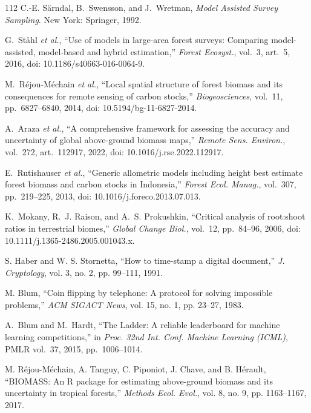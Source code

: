 \documentclass[conference,a4paper]{IEEEtran}
\begin{document}
\begin{thebibliography}{112}
C.-E. S\"arndal, B.~Swensson, and J.~Wretman, \textit{Model Assisted Survey Sampling}. New York: Springer, 1992.

G.~St\aa hl \textit{et al.}, ``Use of models in large-area forest surveys: Comparing model-assisted, model-based and hybrid estimation,'' \textit{Forest Ecosyst.}, vol.~3, art.~5, 2016, doi: 10.1186/s40663-016-0064-9.

M.~R\'ejou-M\'echain \textit{et al.}, ``Local spatial structure of forest biomass and its consequences for remote sensing of carbon stocks,'' \textit{Biogeosciences}, vol.~11, pp.~6827--6840, 2014, doi: 10.5194/bg-11-6827-2014.

A.~Araza \textit{et al.}, ``A comprehensive framework for assessing the accuracy and uncertainty of global above-ground biomass maps,'' \textit{Remote Sens. Environ.}, vol.~272, art.~112917, 2022, doi: 10.1016/j.rse.2022.112917.

E.~Rutishauser \textit{et al.}, ``Generic allometric models including height best estimate forest biomass and carbon stocks in Indonesia,'' \textit{Forest Ecol. Manag.}, vol.~307, pp.~219--225, 2013, doi: 10.1016/j.foreco.2013.07.013.

K.~Mokany, R.~J. Raison, and A.~S. Prokushkin, ``Critical analysis of root:shoot ratios in terrestrial biomes,'' \textit{Global Change Biol.}, vol.~12, pp.~84--96, 2006, doi: 10.1111/j.1365-2486.2005.001043.x.

S. Haber and W. S. Stornetta, ``How to time-stamp a digital document,'' \textit{J. Cryptology}, vol. 3, no. 2, pp. 99--111, 1991.

M. Blum, ``Coin flipping by telephone: A protocol for solving impossible problems,'' \textit{ACM SIGACT News}, vol. 15, no. 1, pp. 23--27, 1983.

A.~Blum and M.~Hardt, ``The Ladder: A reliable leaderboard for machine learning competitions,'' in \textit{Proc. 32nd Int. Conf. Machine Learning (ICML)}, PMLR vol.~37, 2015, pp.~1006--1014.

M. R\'ejou-M\'echain, A. Tanguy, C. Piponiot, J. Chave, and B. H\'erault, ``BIOMASS: An R package for estimating above-ground biomass and its uncertainty in tropical forests,'' \textit{Methods Ecol. Evol.}, vol. 8, no. 9, pp. 1163--1167, 2017.


\end{thebibliography}
\end{document}
